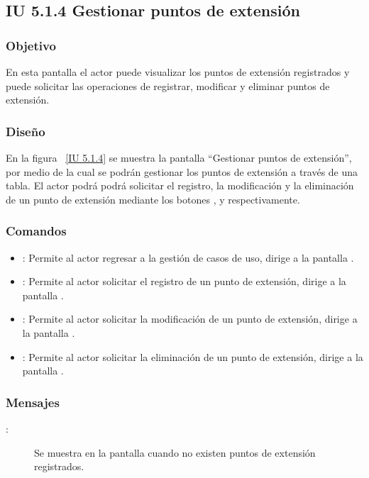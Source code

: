 \subsection{IU 5.1.4 Gestionar puntos de extensión}
\subsubsection{Objetivo}
	
	En esta pantalla el actor puede visualizar los puntos de extensión registrados y puede solicitar las operaciones de registrar, modificar y eliminar puntos de extensión.

\subsubsection{Diseño}

    En la figura ~\ref{IU 5.1.4} se muestra la pantalla ``Gestionar puntos de extensión'', por medio de la cual 
    se podrán gestionar los puntos de extensión a través de una tabla.
    El actor podrá podrá solicitar el registro, la modificación y la eliminación de un punto de extensión mediante los botones
    , \btnEditar y \btnEliminar respectivamente. \\
    



\subsubsection{Comandos}
\begin{itemize}
	\item {}: Permite al actor regresar a la gestión de casos de uso, dirige a la pantalla .
	\item {}: Permite al actor solicitar el registro de un punto de extensión, dirige a la pantalla .
	\item \btnEditar[Modificar]: Permite al actor solicitar la modificación de un punto de extensión, dirige a la pantalla .
	\item \btnEliminar[Eliminar]: Permite al actor solicitar la eliminación de un punto de extensión, dirige a la pantalla .
\end{itemize}

\subsubsection{Mensajes}

	
\begin{description}
	\item[:] Se muestra en la pantalla  cuando no existen puntos de extensión registrados.
\end{description}
